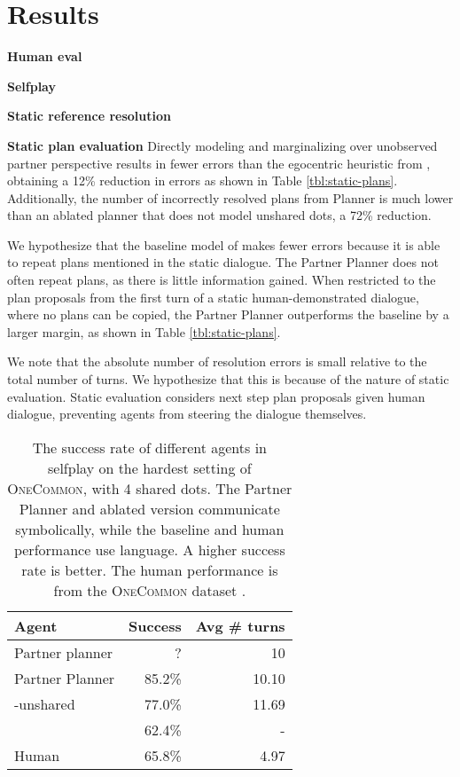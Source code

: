 \documentclass[11pt]{article}
\begin{document}
\section{Results}
\textbf{Human eval}

\textbf{Selfplay}

\textbf{Static reference resolution}

\textbf{Static plan evaluation}
Directly modeling and marginalizing over unobserved partner perspective results in fewer
errors than the egocentric heuristic from \citet{fried}, obtaining a 12\% reduction in errors as shown in Table \ref{tbl:static-plans}.
Additionally, the number of incorrectly resolved plans from Planner is much lower than an ablated planner that does not model unshared dots, a 72\% reduction.

We hypothesize that the baseline model of \citet{fried} makes fewer errors because it is able to repeat plans mentioned in the static dialogue.
The Partner Planner does not often repeat plans, as there is little information gained.
When restricted to the plan proposals from the first turn of a static human-demonstrated dialogue, where no plans can be copied, the Partner Planner outperforms the baseline by a larger margin, as shown in Table \ref{tbl:static-plans}.

We note that the absolute number of resolution errors is small relative to the total number of turns.
We hypothesize that this is because of the nature of static evaluation.
Static evaluation considers next step plan proposals given human dialogue,
preventing agents from steering the dialogue themselves.

\begin{table}[!t]
\centering
\begin{tabular}{lrr}
\toprule
Agent                   & Success & Avg \# turns\\
\midrule
Partner planner         & ?        & 10\\
Partner Planner         & 85.2\%  & 10.10\\
\quad -unshared         & 77.0\%  & 11.69\\
\citet{fried}           & 62.4\%  & -\\
Human                   & 65.8\%  & 4.97\\
\bottomrule
\end{tabular}
\caption{\label{tbl:selfplay}
The success rate of different agents in selfplay on the hardest setting of \textsc{OneCommon}, with 4 shared dots.
The Partner Planner and ablated version communicate symbolically,
while the \citet{fried} baseline and human
performance use language.
A higher success rate is better.
The human performance is from the \textsc{OneCommon} dataset
\citep{onecommon}.
}
\end{table}
\end{document}
